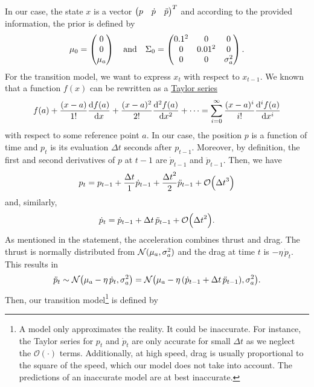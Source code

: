 \documentclass[11pt, a4paper]{article}
\begin{document}
\begin{enumerate}
\begin{solution}
        In our case, the state $x$ is a vector $\begin{pmatrix}p & \dot{p} & \ddot{p}\end{pmatrix}^T$ and according to the provided information, the prior is defined by
        \begin{equation*}
            \mu_0 = \begin{pmatrix}0 \\ 0 \\ \mu_a\end{pmatrix} \quad \text{and} \quad \Sigma_0 = \begin{pmatrix}0.1^2 & 0 & 0 \\ 0 & 0.01^2 & 0 \\ 0 & 0 & \sigma_a^2\end{pmatrix} .
        \end{equation*}
        For the transition model, we want to express $x_t$ with respect to $x_{t-1}$. We known that a function $f(x)$ can be rewritten as a \href{https://en.wikipedia.org/wiki/Taylor_series}{Taylor series}
        \begin{equation*}
            f(a) + \frac{(x - a)}{1!} \frac{\operatorname{d}\!{f}(a)}{\operatorname{d}\!{x}} + \frac{(x - a)^2}{2!} \frac{\operatorname{d}\!{^2f}(a)}{\operatorname{d}\!{x}^2} + \dots = \sum_{i = 0}^{\infty} \frac{(x - a)^i}{i!} \frac{\operatorname{d}\!{^if}(a)}{\operatorname{d}\!{x}^i}
        \end{equation*}
        with respect to some reference point $a$. In our case, the position $p$ is a function of time and $p_t$ is its evaluation $\Delta t$ seconds after $p_{t-1}$. Moreover, by definition, the first and second derivatives of $p$ at $t-1$ are $\dot{p}_{t-1}$ and $\ddot{p}_{t-1}$. Then, we have
        \begin{equation*}
            p_t = p_{t-1} + \frac{\Delta t}{1} \dot{p}_{t-1} + \frac{{\Delta t}^2}{2} \ddot{p}_{t-1} + \mathcal{O}\rbk*{{\Delta t}^3}
        \end{equation*}
        and, similarly,
        \begin{equation*}
            \dot{p}_t = \dot{p}_{t-1} + \Delta t \, \ddot{p}_{t-1} + \mathcal{O}\rbk*{{\Delta t}^2} .
        \end{equation*}
        As mentioned in the statement, the acceleration combines thrust and drag. The thrust is normally distributed from $\mathcal{N}(\mu_a, \sigma_a^2)$ and the drag at time $t$ is $-\eta \, \dot{p}_t$. This results in
        \begin{equation*}
            \ddot{p}_t \sim \N\rbk*{\mu_a - \eta \, \dot{p}_t, \sigma_a^2} = \N\rbk*{\mu_a - \eta \, (\dot{p}_{t - 1} + \Delta t \, \ddot{p}_{t - 1}), \sigma_a^2} .
        \end{equation*}
        Then, our transition model\footnote{A model only approximates the reality. It could be inaccurate. For instance, the Taylor series for $p_t$ and $\dot{p}_t$ are only accurate for small $\Delta t$ as we neglect the $\mathcal{O}(\cdot)$ terms. Additionally, at high speed, drag is usually proportional to the square of the speed, which our model does not take into account. The predictions of an inaccurate model are at best inaccurate.} is defined by

\end{solution}
\end{enumerate}
\end{document}
